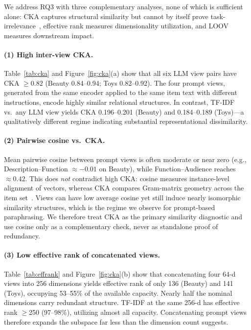 \documentclass[sigconf,natbib=true,anonymous]{acmart}
\begin{document}
We address RQ3 with three complementary analyses, none of which is sufficient alone: CKA captures structural similarity but cannot by itself prove task-irrelevance~\cite{kornblith2019cka}, effective rank measures dimensionality utilization, and LOOV measures downstream impact.

\paragraph{(1) High inter-view CKA.}
Table~\ref{tab:cka} and Figure~\ref{fig:cka}(a) show that all six LLM view pairs have CKA $\ge 0.82$ (Beauty 0.84--0.94; Toys 0.82--0.92).
The four prompt views, generated from the same encoder applied to the same item text with different instructions, encode highly similar relational structures.
In contrast, TF-IDF vs.\ any LLM view yields CKA 0.196--0.201 (Beauty) and 0.184--0.189 (Toys)---a qualitatively different regime indicating substantial representational dissimilarity.

\paragraph{(2) Pairwise cosine vs.\ CKA.}
Mean pairwise cosine between prompt views is often moderate or near zero (e.g., Description--Function $\approx -0.01$ on Beauty), while Function--Audience reaches $\approx 0.42$.
This does \emph{not} contradict high CKA: cosine measures instance-level alignment of vectors, whereas CKA compares Gram-matrix geometry across the item set~\cite{kornblith2019cka}.
Views can have low average cosine yet still induce nearly isomorphic similarity structures, which is the regime we observe for prompt-based paraphrasing.
We therefore treat CKA as the primary similarity diagnostic and use cosine only as a complementary check, never as standalone proof of redundancy.

\paragraph{(3) Low effective rank of concatenated views.}
Table~\ref{tab:effrank} and Figure~\ref{fig:cka}(b) show that concatenating four 64-d views into 256 dimensions yields effective rank of only 136 (Beauty) and 141 (Toys), occupying 53--55\% of the available capacity.
Nearly half the nominal dimensions carry redundant structure.
TF-IDF at the same 256-d has effective rank $\ge$250 (97--98\%), utilizing almost all capacity.
Concatenating prompt views therefore expands the subspace far less than the dimension count suggests.
\end{document}
